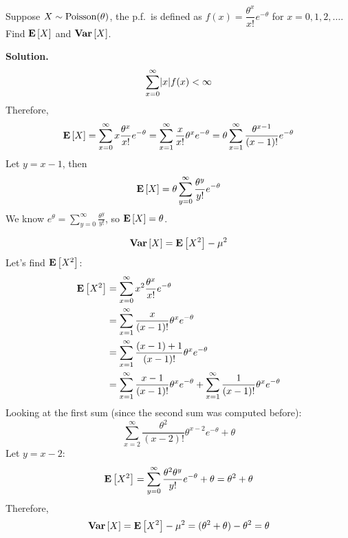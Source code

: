 \begin{Example}{}{}
    Suppose $ X \sim \operatorname{Poisson}(\theta) $, the p.f.\ is defined as
    $ f(x)=\dfrac{\theta^x}{x!} e^{-\theta} $
    for $ x=0,1,2,\ldots $. Find $ \bm{\mathrm{E}}\left[X\right] $ and $ \bm{\mathrm{Var}}\left[X\right] $.

    \textbf{Solution.}
    \[ \sum\limits_{x=0}^{\infty} \lvert x\rvert f(x)<\infty \]
    Therefore,
    \[ \bm{\mathrm{E}}\left[X\right]=\sum\limits_{x=0}^{\infty} x \frac{\theta^x}{x!} e^{-\theta}
        =\sum\limits_{x=1}^{\infty} \frac{x}{x!} \theta^x e^{-\theta}
        =\theta \sum\limits_{x=1}^{\infty} \frac{\theta^{x-1}}{(x-1)!}
        e^{-\theta}  \]
    Let $ y=x-1 $, then
    \[ \bm{\mathrm{E}}\left[X\right]= \theta\sum\limits_{y=0}^{\infty} \frac{\theta^y}{y!} e^{-\theta} \]
    We know $\displaystyle  e^{\theta}=\sum\limits_{y=0}^{\infty} \frac{\theta^y}{y!} $,
    so $ \bm{\mathrm{E}}\left[X\right]= \theta $.

    \[ \bm{\mathrm{Var}}\left[X\right]=\bm{\mathrm{E}}\left[X^2\right]-\mu^2 \]
    Let's find $ \bm{\mathrm{E}}\left[X^2\right] $:
    \begin{align*}
        \bm{\mathrm{E}}\left[X^2\right]
         & =\sum\limits_{x=0}^{\infty} x^2 \frac{\theta^x}{x!} e^{-\theta}         \\
         & =\sum\limits_{x=1}^{\infty} \frac{x}{(x-1)!}\theta^x e^{-\theta}        \\
         & =\sum\limits_{x=1}^{\infty} \frac{(x-1)+1}{(x-1)!} \theta^x e^{-\theta} \\
         & =\sum\limits_{x=1}^{\infty} \frac{x-1}{(x-1)!}\theta^x e^{-\theta}+
        \sum\limits_{x=1}^{\infty} \frac{1}{(x-1)!}\theta^x e^{-\theta}
    \end{align*}
    Looking at the first sum (since the second sum was computed before):
    \[ \sum\limits_{x=2}^{\infty} \frac{\theta^2}{(x-2)!} \theta^{x-2}e^{-\theta}+\theta \]
    Let $ y=x-2 $:
    \[ \bm{\mathrm{E}}\left[X^2\right]=\sum\limits_{y=0}^{\infty}\frac{\theta^2\theta^y}{y!}e^{-\theta}+\theta=
        \theta^2+\theta   \]
    Therefore,
    \[ \bm{\mathrm{Var}}\left[X\right]=\bm{\mathrm{E}}\left[X^2\right]-\mu^2=(\theta^2+\theta)-\theta^2=\theta \]
\end{Example}
